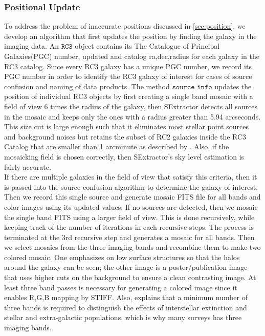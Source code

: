 \documentclass[5p]{elsarticle}
\begin{document}
	\subsubsection{Positional Update} 
	To address the problem of inaccurate positions discussed in \autoref{sec:position}, we develop an algorithm that first updates the position by finding the galaxy in the imaging data. An  $\texttt{RC3}$ object contains its The Catalogue of Principal Galaxies(PGC) number, updated and catalog ra,dec,radius for each galaxy in the RC3 catalog. Since every RC3 galaxy has a unique PGC number, we record  its PGC number in order to identify the RC3 galaxy of interest for cases of source confusion and naming of data products. The method $\texttt{source\_info}$ updates the position of individual RC3 objects by first creating a single band mosaic with a field of view 6 times the radius of the galaxy, then SExtractor detects all sources in the mosaic and keeps only the ones with a radius greater than 5.94 arcseconds. This size cut is large enough such that it eliminates most stellar point sources and background noises  but retains the subset of RC2 galaxies inside the RC3 Catalog that are smaller than 1 arcminute as described by \citealp{rc2}. Also, if the mosaicking field is chosen correctly, then SExtractor's sky level estimation is fairly accurate.  
\\
\indent If there are multiple galaxies in the field of view that satisfy this criteria, then it is passed into the source confusion algorithm to determine the galaxy of interest. Then we record this single source and generate mosaic FITS file for all bands and color images using its updated values. If no sources are detected, then we mosaic the single band FITS using a larger field of view. This is done recursively, while keeping track of the number of iterations in each recursive steps. The process is terminated at the 3rd recursive step and generates a mosaic for all bands. Then we select mosaics from the three imaging bands  and recombine them to make two  colored mosaic. \label{sec:best_low}One emphasizes on low surface structures  so that the halos around the galaxy can be seen; the other image is a poster/publication image that uses higher cuts on the background to ensure a clean contrasting image. At least three band passes is necessary for generating a colored image since it enables R,G,B mapping by STIFF. Also, \citealp{2mass} explains that a minimum number of three bands  is required to distinguish the effects of interstellar extinction and stellar and extra-galactic populations, which is why many surveys has three imaging bands.
\end{document}

